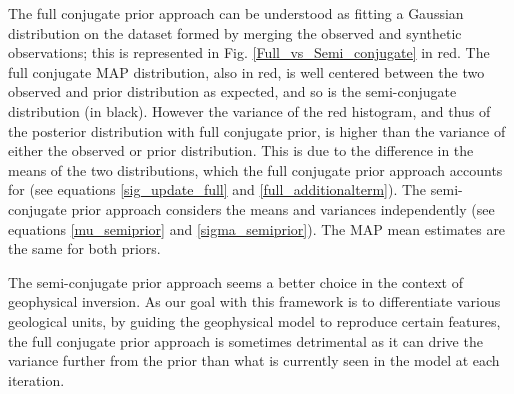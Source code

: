 The full conjugate prior approach can be understood as fitting a Gaussian distribution on the dataset formed by merging the observed and synthetic observations; this is represented in Fig. \ref{Full_vs_Semi_conjugate} in red. The full conjugate MAP distribution, also in red, is well centered between the two observed and prior distribution as expected, and so is the semi-conjugate distribution (in black). However the variance of the red histogram, and thus of the posterior distribution with full conjugate prior, is higher than the variance of either the observed or prior distribution. This is due to the difference in the means of the two distributions, which the full conjugate prior approach accounts for (see equations \ref{sig_update_full} and \ref{full_additionalterm}). The semi-conjugate prior approach considers the means and variances independently (see equations \ref{mu_semiprior} and \ref{sigma_semiprior}). The MAP mean estimates are the same for both priors.

The semi-conjugate prior approach seems a better choice in the context of geophysical inversion. As our goal with this framework is to differentiate various geological units, by guiding the geophysical model to reproduce certain features, the full conjugate prior approach is sometimes detrimental as it can drive the variance further from the prior than what is currently seen in the model at each iteration.


 \label{section:pseudocode}

